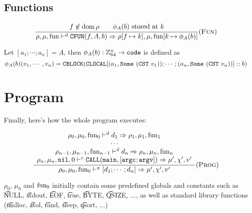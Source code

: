 \subsection{Functions}
\[\dfrac{\begin{array}{c}
    f\not\in\operatorname{dom}\rho \qquad \phi_A(b)\text{ stored at } k
\end{array}}{\rho,\mu,\text{fun} \vdash^d \texttt{CFUN}(f, A, b) \Rightarrow \rho[f\mapsto k],\mu,\text{fun}[k\mapsto \phi_A(b)]} (\textsc{Fun})\]

Let \([a_1; \cdots; a_n] = A\), then \(\phi_A(b): \mathbb{Z}_{64}^n\to \texttt{code}\) is defined as
\[\phi_A(b)(v_1, \cdots, v_n) = \texttt{CBLOCK}(\texttt{CLOCAL}[(a_1, \texttt{Some}\ (\texttt{CST}\ v_1)); \cdots; (a_n, \texttt{Some}\ (\texttt{CST}\ v_n))] :: b)\]

\section{Program}

Finally, here's how the whole program executes:

\[\dfrac{\begin{array}{c}
    \rho_0,\mu_0,\text{fun}_0 \vdash^d d_1 \Rightarrow \rho_1,\mu_1,\text{fun}_1 \\
    \cdots \\
    \rho_{n-1},\mu_{n-1},\text{fun}_{n-1} \vdash^d d_n \Rightarrow \rho_n,\mu_n,\text{fun}_n \\
    \rho_n,\mu_n,\texttt{nil},0 \vdash^e \texttt{CALL}(\texttt{main}, [\texttt{argc}; \texttt{argv}]) \Rightarrow \mu',\chi',v' \\
\end{array}}{\rho_0,\mu_0,\text{fun}_0 \vdash^\pi [d_1; \cdots; d_n] \Rightarrow \mu',\chi',v'} (\textsc{Prog})\]

\(\rho_0\), \(\mu_0\) and \(\text{fun}_0\) initially contain some predefined globals and constants such as \t{NULL}, \t{stdout}, \t{EOF}, \t{true}, \t{BYTE}, \t{QSIZE}, ..., as well as standard library functions (\t{malloc}, \t{atol}, \t{rand}, \t{sleep}, \t{qsort}, ...)\\




